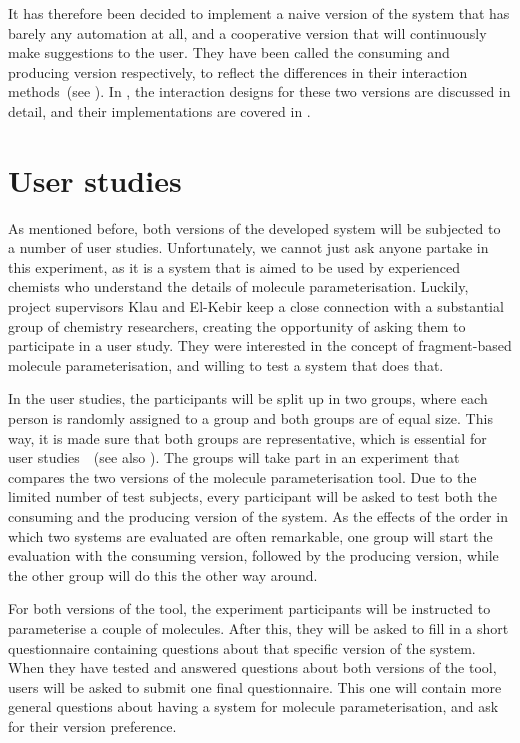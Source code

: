 It has therefore been decided to implement a naive version of the system that has barely any automation at all, and a cooperative version that will continuously make suggestions to the user. They have been called the consuming and producing version respectively, to reflect the differences in their interaction methods~(see ). In , the interaction designs for these two versions are discussed in detail, and their implementations are covered in .



\section{User studies}
As mentioned before, both versions of the developed system will be subjected to a number of user studies. Unfortunately, we cannot just ask anyone partake in this experiment, as it is a system that is aimed to be used by experienced chemists who understand the details of molecule parameterisation. Luckily, project supervisors Klau and El-Kebir keep a close connection with a substantial group of chemistry researchers, creating the opportunity of asking them to participate in a user study. They were interested in the concept of fragment-based molecule parameterisation, and willing to test a system that does that.

In the user studies, the participants will be split up in two groups, where each person is randomly assigned to a group and both groups are of equal size. This way, it is made sure that both groups are representative, which is essential for user studies~\cite{wohlin2003empirical}~(see also ). The groups will take part in an experiment that compares the two versions of the molecule parameterisation tool. Due to the limited number of test subjects, every participant will be asked to test both the consuming and the producing version of the system. As the effects of the order in which two systems are evaluated are often remarkable, one group will start the evaluation with the consuming version, followed by the producing version, while the other group will do this the other way around.

For both versions of the tool, the experiment participants will be instructed to parameterise a couple of molecules. After this, they will be asked to fill in a short questionnaire containing questions about that specific version of the system. When they have tested and answered questions about both versions of the tool, users will be asked to submit one final questionnaire. This one will contain more general questions about having a system for molecule parameterisation, and ask for their version preference.

